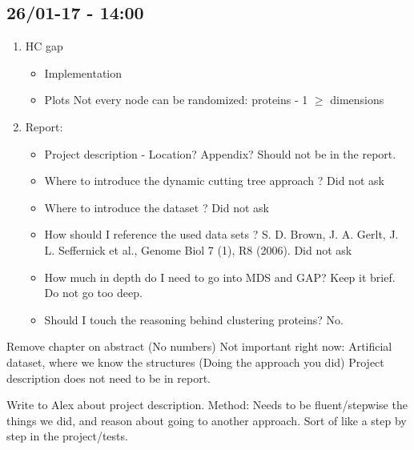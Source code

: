 \documentclass[a4paper,10pt]{article}
\begin{document}
\newpage
\subsection{26/01-17 - 14:00}
\begin{enumerate}
	\item HC gap
		\begin{itemize}
			\item Implementation
			\item Plots
				\subitem Not every node can be randomized: proteins - 1 $\geq$ dimensions
		\end{itemize}
	\item Report:
		\begin{itemize}
			\item Project description - Location? Appendix? 
				\subitem Should not be in the report.
			\item Where to introduce the dynamic cutting tree approach ?
				\subitem Did not ask
			\item Where to introduce the dataset ?
				\subitem Did not ask
			\item How should I reference the used data sets ?
				\subitem S. D. Brown, J. A. Gerlt, J. L. Seffernick et al., Genome Biol 7 (1), R8 (2006).
				\subitem Did not ask
			\item How much in depth do I need to go into MDS and GAP?
				\subitem Keep it brief. Do not go too deep.
			\item Should I touch the reasoning behind clustering proteins?
				\subitem No.
		\end{itemize}
\end{enumerate}
Remove chapter on abstract (No numbers)
Not important right now: Artificial dataset, where we know the structures (Doing the approach you did)
Project description does not need to be in report.

Write to Alex about project description.
Method: Needs to be fluent/stepwise the things we did, and reason about going to another approach.
Sort of like a step by step in the project/tests.
\end{document}
